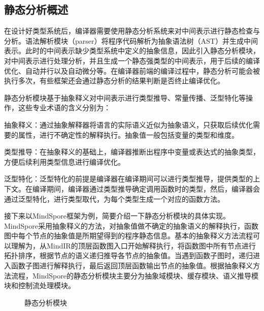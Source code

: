 \documentclass[letterpaper,10pt,english]{sphinxmanual}
\let\sphinxpxdimen\pdfpxdimen\else\newdimen\sphinxpxdimen
\begin{document}
\subsection{静态分析概述}
\label{\detokenize{chapter_frontend_and_ir/type_system_and_static_analysis:id6}}
\sphinxAtStartPar
在设计好类型系统后，编译器需要使用静态分析系统来对中间表示进行静态检查与分析。语法解析模块（parser）将程序代码解析为抽象语法树（AST）并生成中间表示。此时的中间表示缺少类型系统中定义的抽象信息，因此引入静态分析模块，对中间表示进行处理分析，并且生成一个静态强类型的中间表示，用于后续的编译优化、自动并行以及自动微分等。在编译器前端的编译过程中，静态分析可能会被执行多次，有些框架还会通过静态分析的结果判断是否终止编译优化。

\sphinxAtStartPar
静态分析模块基于抽象释义对中间表示进行类型推导、常量传播、泛型特化等操作，这些专业术语的含义分别为：

\sphinxAtStartPar
抽象释义：通过抽象解释器将语言的实际语义近似为抽象语义，只获取后续优化需要的属性，进行不确定性的解释执行。抽象值一般包括变量的类型和维度。

\sphinxAtStartPar
类型推导：在抽象释义的基础上，编译器推断出程序中变量或表达式的抽象类型，方便后续利用类型信息进行编译优化。

\sphinxAtStartPar
泛型特化：泛型特化的前提是编译器在编译期间可以进行类型推导，提供类型的上下文。在编译期间，编译器通过类型推导确定调用函数时的类型，然后，编译器会通过泛型特化，进行类型取代，为每个类型生成一个对应的函数方法。

\sphinxAtStartPar
接下来以MindSpore框架为例，简要介绍一下静态分析模块的具体实现。MindSpore采用抽象释义的方法，对抽象值做不确定的抽象语义的解释执行，函数图中每个节点的抽象值是所期望得到的程序静态信息。基本的抽象释义方法流程可以理解为，从MindIR的顶层函数图入口开始解释执行，将函数图中所有节点进行拓扑排序，根据节点的语义递归推导各节点的抽象值。当遇到函数子图时，递归进入函数子图进行解释执行，最后返回顶层函数输出节点的抽象值。根据抽象释义方法流程，MindSpore的静态分析模块主要分为抽象域模块、缓存模块、语义推导模块和控制流处理模块。

\begin{figure}[H]
\centering
\capstart

\noindent\sphinxincludegraphics[width=850\sphinxpxdimen]{{静态分析-静态分析模块}.png}
\caption{静态分析模块}\label{\detokenize{chapter_frontend_and_ir/type_system_and_static_analysis:id7}}\label{\detokenize{chapter_frontend_and_ir/type_system_and_static_analysis:static-analysis-module}}\end{figure}
\end{document}
